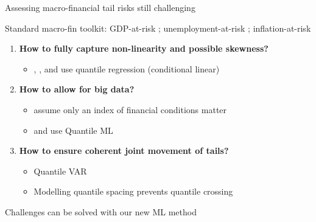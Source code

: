 \documentclass[aspectratio=169]{beamer}
\begin{document}
\begin{frame}{Assessing macro-financial tail risks still challenging}

Standard macro-fin toolkit: GDP-at-risk \parencite{adrianVulnerableGrowth2019}; unemployment-at-risk \parencite{kileyUnemploymentRisk2022}; inflation-at-risk \parencite{lopez-salidoInflationRisk2024}
    \vspace{.4cm}

    \begin{enumerate}
        \item \textbf{How to fully capture non-linearity and possible skewness?}
        \begin{itemize}
            \item \textcite{adrianVulnerableGrowth2019}, \textcite{kileyUnemploymentRisk2022}, and \textcite{lopez-salidoInflationRisk2024} use quantile regression (conditional linear)
        \end{itemize}
        \vspace{.4cm}
        \item \textbf{How to allow for big data?}
        \begin{itemize}
            \item \textcite{adrianVulnerableGrowth2019} assume only an index of financial conditions matter
            \item \textcite{adrianMachinelearningGrowthRisk2025} and \textcite{chiMacroeconomicForecastingMachine2025} use Quantile ML
        \end{itemize}            
        \vspace{.4cm}
        \item \textbf{How to ensure coherent joint movement of tails?}
        \begin{itemize}
            \item Quantile VAR \parencite{chavleishviliForecastingStressTesting2024} %
            \item Modelling quantile spacing \parencite{schmidtQuantileSpacingsSimple2016} prevents quantile crossing
        \end{itemize}
        \vspace{.4cm}
    \end{enumerate}
    Challenges can be solved with our new ML method
\end{frame}
\end{document}
